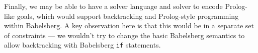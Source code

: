 \documentclass{article}
\begin{document}
Finally, we may be able to have a solver language and solver to encode
Prolog-like goals, which would support backtracking and Prolog-style
programming within Babelsberg.  A key observation here is that this
would be in a separate set of constraints --- we wouldn't try to
change the basic Babelsberg semantics to allow backtracking with
Babelsberg \verb|if| statements.
\end{document}
